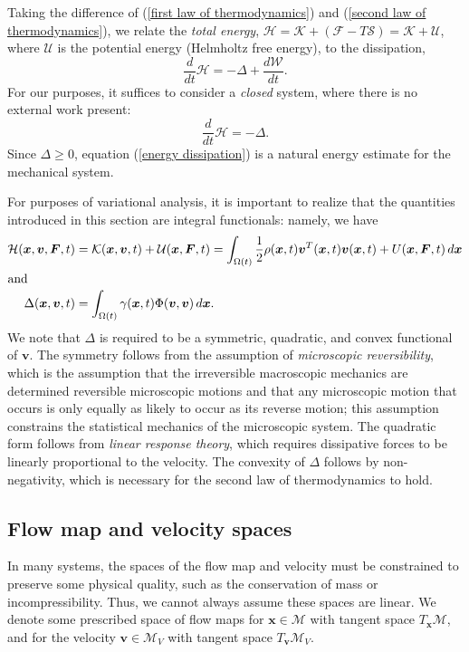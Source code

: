 \documentclass[final,10pt]{article}
\begin{document}
Taking the difference of (\ref{first law of thermodynamics}) and (\ref{second law of thermodynamics}), 
we relate the \emph{total energy}, $\mathcal H = \mathcal K + (\mathcal F-T\mathcal S) = \mathcal K + \mathcal U$,
where $\mathcal U$ is the potential energy (Helmholtz free energy), to the dissipation,
\[
	\frac{d}{dt}\mathcal H		=	-\Delta + \frac{d\mathcal W}{dt}.
\]
For our purposes, it suffices to consider a \emph{closed} system, where there is no external work present:
\begin{equation}	\label{energy dissipation}
	\frac{d}{dt}\mathcal H		=	-\Delta.
\end{equation}
Since $\Delta \ge 0$, equation (\ref{energy dissipation}) is a natural energy estimate for the mechanical system.

For purposes of variational analysis, it is important to realize that the quantities introduced in this section are integral functionals:
namely, we have
\begin{align*}
	\mathcal H(\bm x, \bm v, \bm F, t)		&=\mathcal K(\bm x, \bm v, t) + \mathcal U(\bm x, \bm F, t)
									= \int_{\Omega(t)} \frac12 \rho(\bm x, t) \bm v^T(\bm x,t)\bm v(\bm x,t) +  U(\bm x, \bm F,t) \, d\bm x\\
\intertext{and}
	\Delta(\bm x, \bm v, t)		&= \int_{\Omega(t)} \gamma(\bm x, t) \Phi(\bm v, \bm v) \, d\bm x.
\end{align*}
We note that $\Delta$ is required to be a symmetric, quadratic, and convex functional of $\bm v$.
The symmetry follows from the assumption of \emph{microscopic reversibility},
which is the assumption that the irreversible macroscopic mechanics are determined reversible microscopic motions and that
any microscopic motion that occurs is only equally as likely to occur as its reverse motion; this assumption constrains the statistical mechanics of the microscopic system. 
The quadratic form follows from \emph{linear response theory}, which requires dissipative forces to be linearly proportional to the velocity.
The convexity of $\Delta$ follows by non-negativity, which is necessary for the second law of thermodynamics to hold.

\subsection{Flow map and velocity spaces}
In many systems, the spaces of the flow map and velocity must be constrained to preserve some physical quality,
such as the conservation of mass or incompressibility.
Thus, we cannot always assume these spaces are linear.
We denote some prescribed space of flow maps for $\bm x \in \mathcal M$ with tangent space $T_{\bm x}\mathcal M$,
and for the velocity $\bm v \in \mathcal M_V$ with tangent space $T_{\bm v}\mathcal M_V$. 
\end{document}

